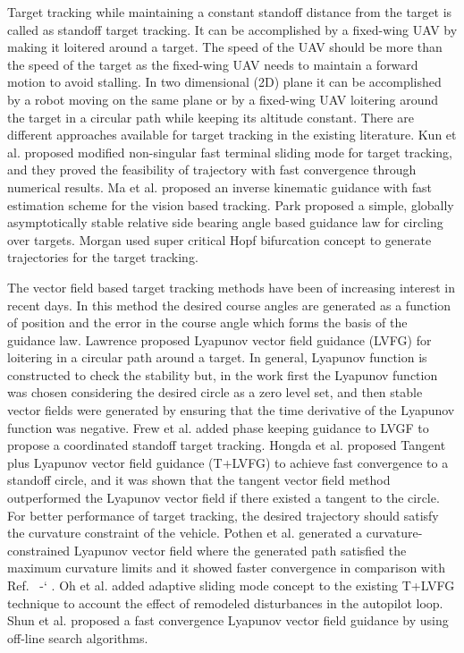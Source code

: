 \documentclass[Afour,sagev,times]{sagej}
\newcommand*{\citen}[1]{%
  \begingroup
    \romannumeral-`\x %
    \setcitestyle{numbers}%
    \cite{#1}%
  \endgroup   
}
\begin{document}
Target tracking while maintaining a constant standoff distance from the target is called as standoff target tracking. It can be accomplished by a fixed-wing UAV by making it loitered around a target. The speed of the UAV should be more than the speed of the target as the fixed-wing UAV needs to maintain a forward motion to avoid stalling. In two dimensional (2D) plane it can be accomplished by a robot moving on the same plane or by a fixed-wing UAV loitering around the target in a circular path while keeping its altitude constant. There are different approaches available for target tracking in the existing literature. Kun et al. \cite{wu2017target} proposed modified non-singular fast terminal sliding mode for target tracking, and they proved the feasibility of trajectory with fast convergence through numerical results.   Ma et al. \cite{ma2010adaptive} proposed an inverse kinematic guidance with fast estimation scheme for the vision based tracking. Park \cite{park2016circling} proposed a simple, globally asymptotically stable relative side bearing angle based guidance law for circling over targets. Morgan \cite{quigley2005target} used super critical Hopf bifurcation concept to generate trajectories for the target tracking. 

The vector field based target tracking methods have been of increasing interest in recent days. In this method the desired course angles are generated as a function of position and the error in the course angle which forms the basis of the guidance law. Lawrence \cite{lawrence2003lyapunov} proposed Lyapunov vector field guidance (LVFG) for loitering in a circular path around a target.  In general, Lyapunov function is constructed to check the stability but, in the work first the Lyapunov function was chosen  considering the desired circle as a zero level set, and then stable vector fields were generated by ensuring that the time derivative of the Lyapunov function was negative.  Frew et al. \cite{frew2008coordinated} added phase keeping guidance to LVGF to propose a coordinated standoff target tracking. Hongda et al. \cite{chen2009tracking} proposed Tangent plus Lyapunov vector field guidance (T+LVFG) to achieve fast convergence to a standoff circle, and it was shown that the tangent vector field method outperformed the Lyapunov vector field \cite{lawrence2003lyapunov} if there existed a tangent to the circle. For better performance of target tracking, the desired trajectory should satisfy the curvature constraint of the vehicle. Pothen et al. \cite{pothen2017curvature} generated a curvature-constrained Lyapunov vector field where the generated path satisfied the maximum curvature limits and it showed faster convergence in comparison with Ref.~\citen{lawrence2003lyapunov}.  Oh et al. \cite{oh2014decentralised} added adaptive sliding mode concept to the existing T+LVFG technique to account the effect of remodeled disturbances in the autopilot loop. Shun et al. \cite{sun2019fast} proposed a fast convergence Lyapunov vector field guidance by using  off-line search algorithms.  
\end{document}
